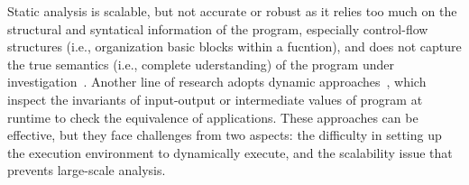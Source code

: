
Static analysis is scalable, but not accurate or robust as it relies too much on the structural and syntatical information of the program, especially control-flow structures (i.e., organization basic blocks within a fucntion), and does not capture the true semantics (i.e., complete uderstanding) of the program under investigation~\cite{DBLP:conf/pldi/DavidY14,saebjornsen2009detecting,luo2014semantics,DBLP:conf/sp/PewnyGGRH15}. 
Another line of research adopts dynamic approaches~\cite{DBLP:conf/issta/JiangS09,DBLP:conf/asplos/Schkufza0A13,DBLP:conf/icse/JhiWJZLW11,DBLP:conf/uss/EgeleWCB14}, which inspect the invariants of input-output or intermediate values of program at runtime to check the equivalence of applications. These approaches can be effective, but they face challenges from two aspects: the difficulty in setting up the execution environment to dynamically execute, and the scalability issue that prevents large-scale analysis.  

